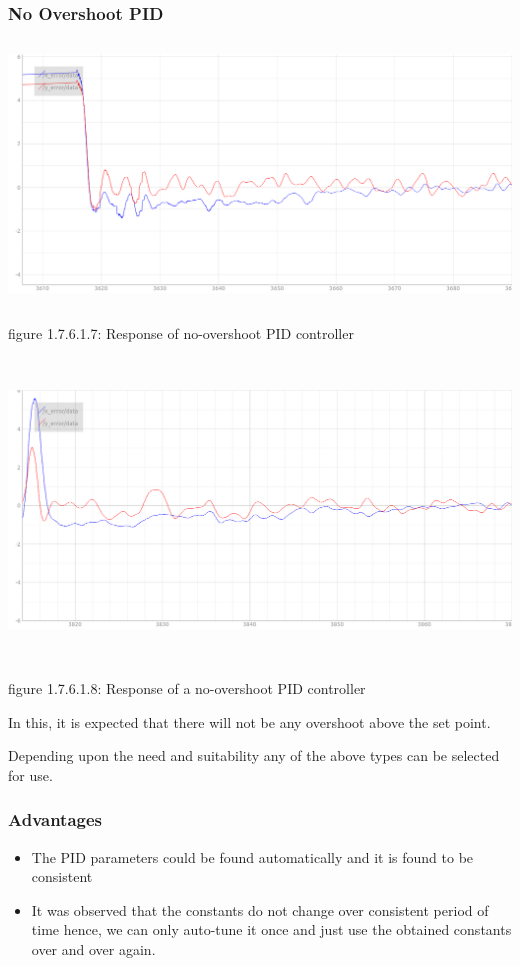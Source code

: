 \documentclass[a4paper,12pt,oneside]{book}
\begin{document}
 \subsubsection{No Overshoot PID}
\begin{flushleft}
\includegraphics[width = 15cm , height= 7cm]{No-overshoot-pid.png}
\begin{center}
    figure 1.7.6.1.7: Response of no-overshoot PID controller
\end{center}
\includegraphics[width = 15cm , height= 8cm]{no-overshoot-pid2.png}
\begin{center}
    figure 1.7.6.1.8: Response of a no-overshoot PID controller
\end{center}
\end{flushleft}
In this, it is expected that there will not be any overshoot above the set point.
 
Depending upon the need and suitability any of the above types can be selected for use.

\subsubsection{Advantages}
\begin{itemize}
    \item The PID parameters could be found automatically and it is found to be consistent
    \item It was observed that the constants do not change over consistent period of time hence, we can only auto-tune it once and just use the obtained constants over and over again.
\end{itemize}
\end{document}
